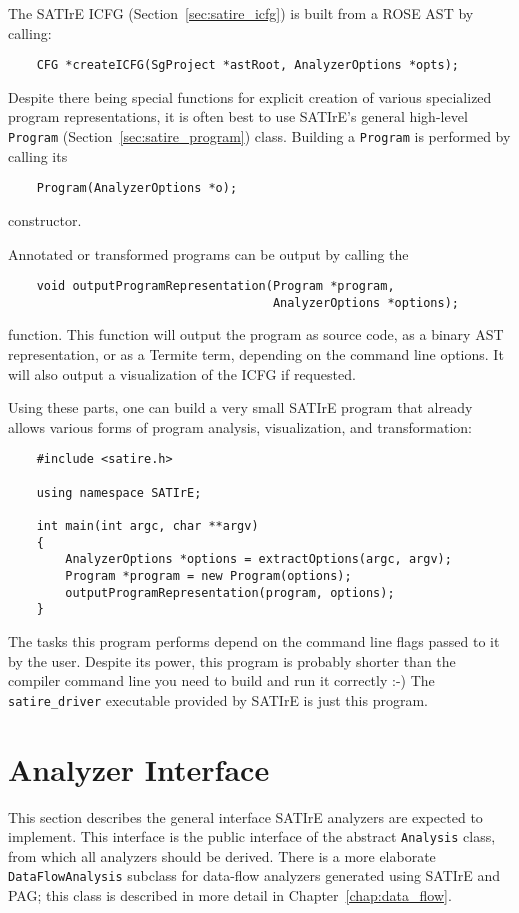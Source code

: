 \documentclass[a4paper,12pt]{report}
\begin{document}
The SATIrE ICFG (Section~\ref{sec:satire_icfg}) is built from a
ROSE AST by calling:
\begin{verbatim}
    CFG *createICFG(SgProject *astRoot, AnalyzerOptions *opts);
\end{verbatim}

Despite there being special functions for explicit creation of various
specialized program representations, it is often best to use SATIrE's
general high-level \texttt{Program} (Section~\ref{sec:satire_program})
class. Building a \texttt{Program} is performed by calling its
\begin{verbatim}
    Program(AnalyzerOptions *o);
\end{verbatim}
constructor.

Annotated or transformed programs can be output by calling the
\begin{verbatim}
    void outputProgramRepresentation(Program *program,
                                     AnalyzerOptions *options);
\end{verbatim}
function. This function will output the program as source code, as a binary
AST representation, or as a Termite term, depending on the command line
options. It will also output a visualization of the ICFG if requested.

Using these parts, one can build a very small SATIrE program that already
allows various forms of program analysis, visualization, and transformation:
\begin{verbatim}
    #include <satire.h>

    using namespace SATIrE;

    int main(int argc, char **argv)
    {
        AnalyzerOptions *options = extractOptions(argc, argv);
        Program *program = new Program(options);
        outputProgramRepresentation(program, options);
    }
\end{verbatim}

The tasks this program performs depend on the command line flags passed to
it by the user. Despite its power, this program is probably shorter than the
compiler command line you need to build and run it correctly :-) The
\verb|satire_driver| executable provided by SATIrE is just this program.

\section{Analyzer Interface}
\label{sec:analyzer_interface}

This section describes the general interface SATIrE analyzers are expected
to implement. This interface is the public interface of the abstract
\texttt{Analysis} class, from which all analyzers should be derived. There
is a more elaborate \texttt{DataFlowAnalysis} subclass for data-flow
analyzers generated using SATIrE and PAG; this class is described in more
detail in Chapter~\ref{chap:data_flow}.
\end{document}
